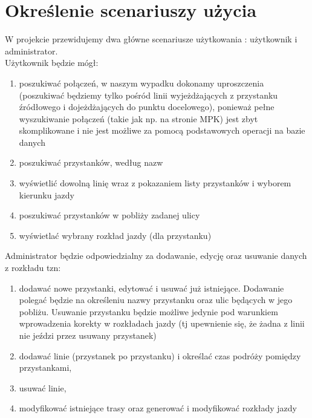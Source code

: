 \section{Określenie scenariuszy użycia}
W projekcie przewidujemy dwa główne scenariusze użytkowania : użytkownik i administrator.\\
Użytkownik będzie mógł:
\begin{enumerate}
\item poszukiwać połączeń, w naszym wypadku dokonamy uproszczenia (poszukiwać będziemy tylko pośród linii wyjeżdżających z przystanku źródłowego i dojeżdżających do punktu docelowego), ponieważ pełne wyszukiwanie połączeń (takie jak np. na stronie MPK) 
jest zbyt skomplikowane i nie jest możliwe za pomocą podstawowych operacji na bazie danych
\item poszukiwać przystanków, według nazw
\item wyświetlić dowolną linię wraz z pokazaniem listy przystanków i wyborem kierunku jazdy
\item poszukiwać przystanków w pobliży zadanej ulicy
\item wyświetlać wybrany rozkład jazdy (dla przystanku)
\end{enumerate}

Administrator będzie odpowiedzialny za dodawanie, edycję oraz usuwanie danych z rozkładu tzn:
\begin{enumerate}
\item dodawać nowe przystanki, edytować i usuwać już istniejące. Dodawanie polegać będzie na określeniu nazwy przystanku oraz ulic będących w jego pobliżu.
Usuwanie przystanku będzie możliwe jedynie pod warunkiem wprowadzenia korekty w rozkładach jazdy (tj upewnienie się, że żadna z linii nie
jeździ przez usuwany przystanek)
\item dodawać linie  (przystanek po przystanku) i określać czas podróży pomiędzy przystankami,
\item usuwać linie,
\item modyfikować istniejące trasy oraz generować i modyfikować rozkłady jazdy
\end{enumerate}



